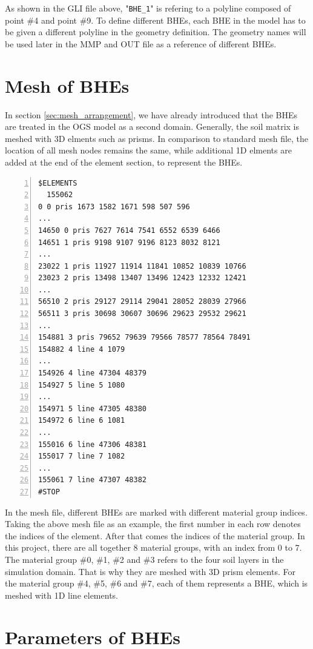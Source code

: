 As shown in the GLI file above,  "\texttt{BHE\_1}" is refering to a polyline composed of point \#4 and point \#9. To define different BHEs, each BHE in the model has to be given a different polyline in the geometry definition. The geometry names will be used later in the MMP and OUT file as a reference of different BHEs. 

\section{Mesh of BHEs}

In section \ref{sec:mesh_arrangement}, we have already introduced that the BHEs are treated in the OGS model as a second domain. Generally, the soil matrix is meshed with 3D elments such as prisms. In comparison to standard mesh file, the location of all mesh nodes remains the same, while additional 1D elments are added at the end of the element section, to represent the BHEs. 

\begin{Verbatim}[gobble=0, 
                 frame=single, 
                 label=The Element Section in Mesh File, 
                 numbers=left]
$ELEMENTS
  155062
0 0 pris 1673 1582 1671 598 507 596 
...
14650 0 pris 7627 7614 7541 6552 6539 6466 
14651 1 pris 9198 9107 9196 8123 8032 8121 
...
23022 1 pris 11927 11914 11841 10852 10839 10766 
23023 2 pris 13498 13407 13496 12423 12332 12421 
...
56510 2 pris 29127 29114 29041 28052 28039 27966 
56511 3 pris 30698 30607 30696 29623 29532 29621 
...
154881 3 pris 79652 79639 79566 78577 78564 78491 
154882 4 line 4 1079 
...
154926 4 line 47304 48379 
154927 5 line 5 1080 
...
154971 5 line 47305 48380 
154972 6 line 6 1081 
...
155016 6 line 47306 48381 
155017 7 line 7 1082 
...
155061 7 line 47307 48382 
#STOP
\end{Verbatim} 

In the mesh file, different BHEs are marked with different material group indices. Taking the above mesh file as an example, the first number in each row denotes the indices of the element. After that comes the indices of the material group. In this project, there are all together 8 material groups, with an index from 0 to 7. The material group \#0, \#1, \#2 and \#3 refers to the four soil layers in the simulation domain. That is why they are meshed with 3D prism elements. For the material group \#4, \#5, \#6 and \#7, each of them represents a BHE, which is meshed with 1D line elements. 

\section{Parameters of BHEs}
\label{sec:mmp_bhe_def}




